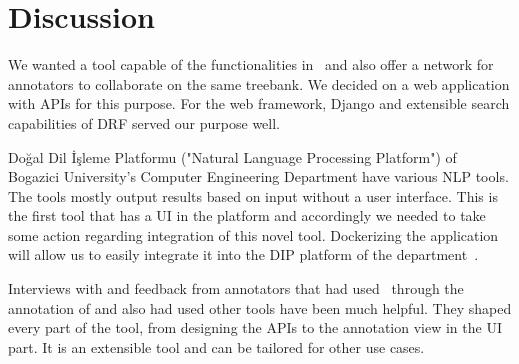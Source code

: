 \section{Discussion}
\label{sec:discussion}

We wanted a tool capable of the functionalities in \boatvone\ and also offer a network for annotators to collaborate on the same treebank.
We decided on a web application with APIs for this purpose.
For the web framework, Django and extensible search capabilities of DRF served our purpose well.

Doğal Dil İşleme Platformu ("Natural Language Processing Platform") of Bogazici University's Computer Engineering Department have various NLP tools.
The tools mostly output results based on input without a user interface.
This is the first tool that has a UI in the platform and accordingly we needed to take some action regarding integration of this novel tool.
Dockerizing the application will allow us to easily integrate it into the DIP platform of the department~\cite{DIP}.

Interviews with and feedback from annotators that had used \boatvone\ through the annotation of \bountreebank{} and also had used other tools have been much helpful.
They shaped every part of the tool, from designing the APIs to the annotation view in the UI part.
It is an extensible tool and can be tailored for other use cases.
